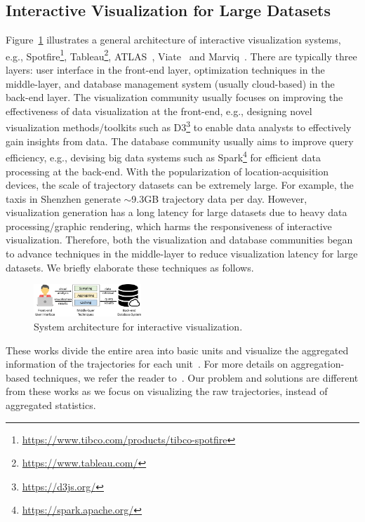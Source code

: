 \subsection{Interactive Visualization for Large Datasets}\label{sec:interactive}


Figure~\ref{fig:sys_framework} illustrates a general architecture of interactive visualization systems,
e.g., Spotfire\footnote{\url{https://www.tibco.com/products/tibco-spotfire}}, Tableau\footnote{\url{https://www.tableau.com/}}, ATLAS~\cite{chan2008maintaining}, Viate~\cite{yang2019vaite} and Marviq~\cite{dong2020marviq}.
There are typically three layers: user interface in the front-end layer, optimization techniques in the middle-layer, and database management system (usually cloud-based) in the back-end layer. The visualization community usually focuses on improving the effectiveness of data visualization at the front-end, e.g., designing novel visualization methods/toolkits such as D3\footnote{\url{https://d3js.org/}} to enable data analysts to effectively gain insights from data. 
The database community usually aims to improve query efficiency, e.g., devising big data systems such as Spark\footnote{\url{https://spark.apache.org/}} for efficient data processing at the back-end. 
With the popularization of location-acquisition devices, the scale of trajectory datasets can be extremely large. For example, the taxis in Shenzhen generate {$\sim$}9.3GB trajectory data per day. However, visualization generation has a long latency for large datasets due to heavy data processing/graphic rendering, which harms the responsiveness of interactive visualization. Therefore, both the visualization and database communities began to advance techniques in the middle-layer to reduce visualization latency for large datasets. We briefly elaborate these techniques as follows.


\begin{figure}
	\centering
	\includegraphics[width=0.36\textwidth]{pictures/framework/framework.pdf}
	\trim
	\caption{System architecture for interactive visualization.} \label{fig:sys_framework}
    \trim \trim
\end{figure}


These works divide the {entire area} into basic units and visualize the aggregated information of the trajectories for each unit~\cite{wood2010visualisation,guo2009flow,von2015mobilitygraphs}. For more details on aggregation-based techniques, we refer the reader to~\cite{andrienko2008spatio,adrienko2010spatial}. Our problem and solutions are different from these works as we focus on visualizing the raw trajectories, instead of aggregated statistics.


